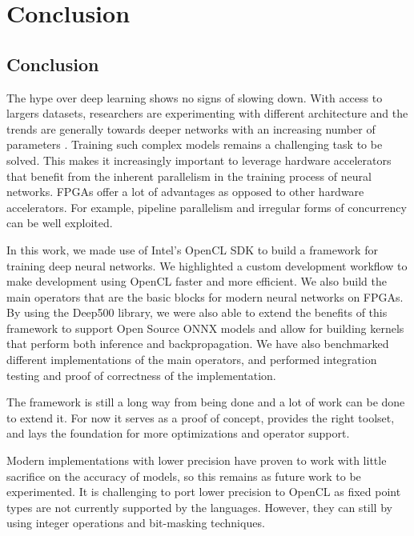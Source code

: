 
\chapter{Conclusion} %

\label{Chapter6} %



\section{Conclusion} 

The hype over deep learning shows no signs of slowing down. With access to largers datasets, researchers are experimenting with different architecture and the trends are generally towards deeper networks with an increasing number of parameters \citep{ddl}. Training such complex models remains a challenging task to be solved. This makes it increasingly important to leverage hardware accelerators that benefit from the inherent parallelism in the training process of neural networks. FPGAs offer a lot of advantages as opposed to other hardware accelerators. For example, pipeline parallelism and irregular forms of concurrency can be well exploited.

In this work, we made use of Intel's OpenCL SDK to build a framework for training deep neural networks. We highlighted a custom development workflow to make development using OpenCL faster and more efficient. We also build the main operators that are the basic blocks for modern neural networks on FPGAs. By using the Deep500 library, we were also able to extend the benefits of this framework to support Open Source ONNX models and allow for building kernels that perform both inference and backpropagation. We have also benchmarked different implementations of the main operators, and performed integration testing and proof of correctness of the implementation. 

The framework is still a long way from being done and a lot of work can be done to extend it. For now it serves as a proof of concept, provides the right toolset, and lays the foundation for more optimizations and operator support.

Modern implementations with lower precision have proven to work with little sacrifice on the accuracy of models, so this remains as future work to be experimented. It is challenging to port lower precision to OpenCL as fixed point types are not currently supported by the languages. However, they can still by using integer operations and bit-masking techniques. 





